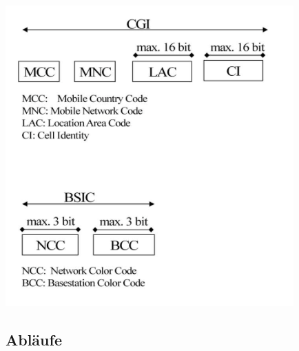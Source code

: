 \begin{minipage}{0.4 \linewidth}
\includegraphics[width =  \linewidth]{./Pics/GSMCGIundBSIC} 
\end{minipage}

\subsection{Abläufe}
